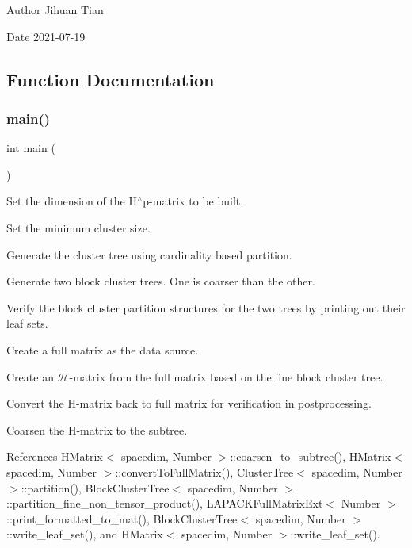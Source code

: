 \begin{DoxyAuthor}{Author}
Jihuan Tian 
\end{DoxyAuthor}
\begin{DoxyDate}{Date}
2021-\/07-\/19 
\end{DoxyDate}


\subsection{Function Documentation}
\mbox{\label{hmatrix-coarsening_8cc_ae66f6b31b5ad750f1fe042a706a4e3d4}} 
\subsubsection{\texorpdfstring{main()}{main()}}
{\footnotesize\ttfamily int main (\begin{DoxyParamCaption}{ }\end{DoxyParamCaption})}

Set the dimension of the H$^\wedge$p-\/matrix to be built.

Set the minimum cluster size.

Generate the cluster tree using cardinality based partition.

Generate two block cluster trees. One is coarser than the other.

Verify the block cluster partition structures for the two trees by printing out their leaf sets.

Create a full matrix as the data source.

Create an $\mathcal{H}$-\/matrix from the full matrix based on the fine block cluster tree.

Convert the H-\/matrix back to full matrix for verification in postprocessing.

Coarsen the H-\/matrix to the subtree.

References H\+Matrix$<$ spacedim, Number $>$\+::coarsen\+\_\+to\+\_\+subtree(), H\+Matrix$<$ spacedim, Number $>$\+::convert\+To\+Full\+Matrix(), Cluster\+Tree$<$ spacedim, Number $>$\+::partition(), Block\+Cluster\+Tree$<$ spacedim, Number $>$\+::partition\+\_\+fine\+\_\+non\+\_\+tensor\+\_\+product(), L\+A\+P\+A\+C\+K\+Full\+Matrix\+Ext$<$ Number $>$\+::print\+\_\+formatted\+\_\+to\+\_\+mat(), Block\+Cluster\+Tree$<$ spacedim, Number $>$\+::write\+\_\+leaf\+\_\+set(), and H\+Matrix$<$ spacedim, Number $>$\+::write\+\_\+leaf\+\_\+set().

